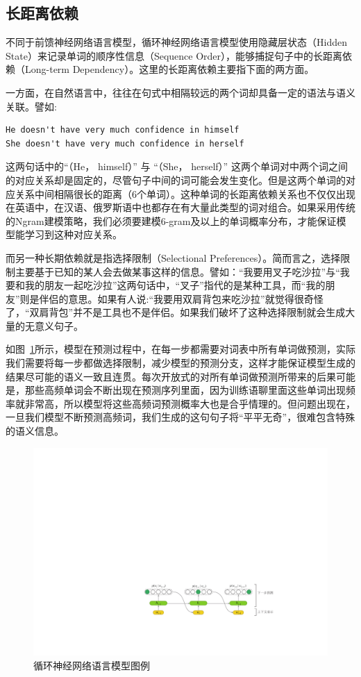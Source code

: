 \subsection{长距离依赖}

不同于前馈神经网络语言模型，循环神经网络语言模型使用隐藏层状态（Hidden State）来记录单词的顺序性信息（Sequence Order），能够捕捉句子中的长距离依赖（Long-term Dependency）。这里的长距离依赖主要指下面的两方面。

一方面，在自然语言中，往往在句式中相隔较远的两个词却具备一定的语法与语义关联。譬如:
\begin{verbatim}
He doesn't have very much confidence in himself
She doesn't have very much confidence in herself
\end{verbatim}
这两句话中的``（He， himself）'' 与 ``（She， herself）'' 这两个单词对中两个词之间的对应关系却是固定的，尽管句子中间的词可能会发生变化。但是这两个单词的对应关系中间相隔很长的距离（6个单词）。这种单词的长距离依赖关系也不仅仅出现在英语中，在汉语、俄罗斯语中也都存在有大量此类型的词对组合。如果采用传统的Ngram建模策略，我们必须要建模6-gram及以上的单词概率分布，才能保证模型能学习到这种对应关系。

而另一种长期依赖就是指选择限制（Selectional Preferences）。简而言之，选择限制主要基于已知的某人会去做某事这样的信息。譬如：``我要用叉子吃沙拉''与``我要和我的朋友一起吃沙拉''这两句话中，``叉子''指代的是某种工具，而``我的朋友''则是伴侣的意思。如果有人说:``我要用双肩背包来吃沙拉''就觉得很奇怪了，``双肩背包''并不是工具也不是伴侣。如果我们破坏了这种选择限制就会生成大量的无意义句子。

如图~\ref{fig:lm}所示，模型在预测过程中，在每一步都需要对词表中所有单词做预测，实际我们需要将每一步都做选择限制，减少模型的预测分支，这样才能保证模型生成的结果尽可能的语义一致且连贯。每次开放式的对所有单词做预测所带来的后果可能是，那些高频单词会不断出现在预测序列里面，因为训练语聊里面这些单词出现频率就非常高，所以模型将这些高频词预测概率大也是合乎情理的。但问题出现在，一旦我们模型不断预测高频词，我们生成的这句句子将``平平无奇''，很难包含特殊的语义信息。

\begin{figure}[!ht]
  \centering
  \includegraphics[width=1\columnwidth]{./figures/lm.pdf}
  \caption{循环神经网络语言模型图例}
  \label{fig:lm}
\end{figure}

